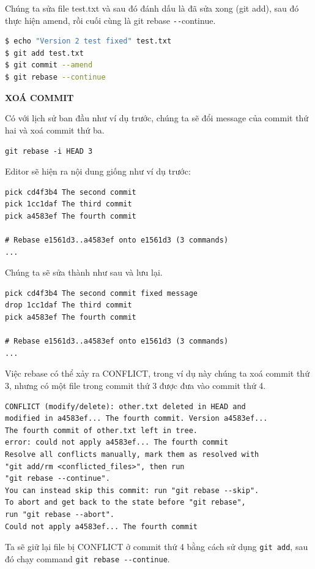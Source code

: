 \documentclass[a4paper, 11pt]{article}
\begin{document}
Chúng ta sửa file test.txt và sau đó đánh dấu là đã sửa xong (git add), sau đó thực hiện amend, rồi cuối cùng là git rebase \texttt{-{}-}continue.

\begin{lstlisting}[language=bash]
$ echo "Version 2 test fixed" test.txt
$ git add test.txt
$ git commit --amend
$ git rebase --continue
\end{lstlisting}

\textit{}

\textbf{XOÁ COMMIT}

Có với lịch sử ban đầu như ví dụ trước, chúng ta sẽ đổi message của commit thứ hai và xoá commit thứ ba.

\texttt{git rebase -i HEAD\string~3}

Editor sẽ hiện ra nội dung giống như ví dụ trước:

\begin{verbatim}
pick cd4f3b4 The second commit
pick 1cc1daf The third commit
pick a4583ef The fourth commit

# Rebase e1561d3..a4583ef onto e1561d3 (3 commands)
...
\end{verbatim}

Chúng ta sẽ sửa thành như sau và lưu lại.

\begin{verbatim}
pick cd4f3b4 The second commit fixed message
drop 1cc1daf The third commit
pick a4583ef The fourth commit

# Rebase e1561d3..a4583ef onto e1561d3 (3 commands)
...
\end{verbatim}

Việc rebase có thể xảy ra CONFLICT, trong ví dụ này chúng ta xoá commit thứ 3, nhưng có một file trong commit thứ 3 được đưa vào commit thứ 4.

\begin{verbatim}
CONFLICT (modify/delete): other.txt deleted in HEAD and 
modified in a4583ef... The fourth commit. Version a4583ef... 
The fourth commit of other.txt left in tree.
error: could not apply a4583ef... The fourth commit
Resolve all conflicts manually, mark them as resolved with
"git add/rm <conflicted_files>", then run 
"git rebase --continue".
You can instead skip this commit: run "git rebase --skip".
To abort and get back to the state before "git rebase", 
run "git rebase --abort".
Could not apply a4583ef... The fourth commit
\end{verbatim}

Ta sẽ giữ lại file bị CONFLICT ở commit thứ 4 bằng cách sử dụng \texttt{git add}, sau đó chạy command \texttt{git rebase \texttt{-{}-}continue}.
\end{document}

